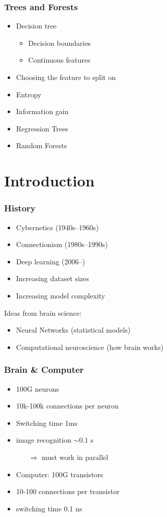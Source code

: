 \documentclass[mathserif]{beamer}
\begin{document}
\begin{frame}
  \frametitle{Trees and Forests}
  \begin{itemize}
  \item Decision tree
    \begin{itemize}
    \item Decision boundaries
    \item Continuous features
    \end{itemize}
  \item Choosing the feature to split on
  \item Entropy
  \item Information gain
  \item Regression Trees
  \item Random Forests
  \end{itemize}
\end{frame}

\section{Introduction}
\frame{\tableofcontents[currentsubsection]}

\begin{frame}
  \frametitle{History}
  \begin{itemize}
  \item Cybernetics (1940s--1960s)
  \item Connectionism (1980s--1990s)
  \item Deep learning (2006--)
  \item Increasing dataset sizes
  \item Increasing model complexity
  \end{itemize}
  Ideas from brain science:
  \begin{itemize}
  \item Neural Networks (statistical models)
  \item Computational neuroscience (how brain works)
  \end{itemize}
\end{frame}

\begin{frame}
  \frametitle{Brain \& Computer}
  \begin{itemize}
  \item 100G neurons
  \item 10k-100k connections per neuron
  \item Switching time 1ms
  \item image recognition $\sim 0.1$ s
    \begin{itemize}
    \item[$\Rightarrow$] must work in parallel
    \end{itemize}
  \item Computer: 100G transistors
  \item 10-100 connections per transistor
  \item switching time 0.1 ns
  \end{itemize}
\end{frame}
\end{document}
